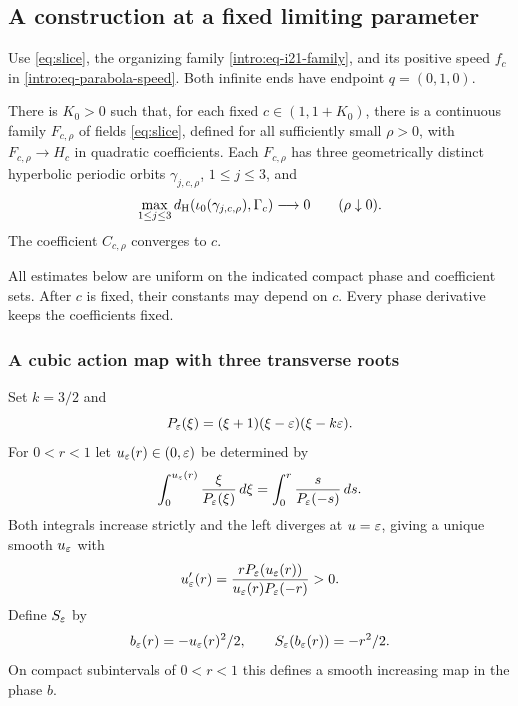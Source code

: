 \subsection{A construction at a fixed limiting parameter}

Use \eqref{eq:slice}, the organizing family \eqref{intro:eq-i21-family},
and its positive speed \(f_c\) in \eqref{intro:eq-parabola-speed}.
Both infinite ends have endpoint \(q=(0,1,0)\).

\begin{theorem}\label{p4:fixed-c}
There is $K_0>0$ such that, for each fixed $c\in(1,1+K_0)$, there is
a continuous family $F_{c,\rho}$ of fields \eqref{eq:slice},
defined for all sufficiently small $\rho>0$, with
$F_{c,\rho}\to H_c$ in quadratic coefficients.
Each $F_{c,\rho}$ has three geometrically distinct hyperbolic periodic
orbits $\gamma_{j,c,\rho}$, $1\le j\le3$, and
\[
 \max_{1\le j\le3}d_{\rm H}(\iota_0(\gamma_{j,c,\rho}),\Gamma_c)
 \longrightarrow0\qquad(\rho\downarrow0).
\]
The coefficient $C_{c,\rho}$ converges to $c$.
\end{theorem}

All estimates below are uniform on the indicated compact phase and
coefficient sets. After $c$ is fixed, their constants may depend on $c$.
Every phase derivative keeps the coefficients fixed.

\subsubsection{A cubic action map with three transverse roots}

Set $k=3/2$ and
\[
 P_\varepsilon(\xi)=(\xi+1)(\xi-\varepsilon)(\xi-k\varepsilon).
\]
For $0<r<1$ let $u_\varepsilon(r)\in(0,\varepsilon)$ be determined by
\begin{equation}\label{p4:action}
 \int_0^{u_\varepsilon(r)}\frac{\xi}{P_\varepsilon(\xi)}\,d\xi
 =\int_0^r\frac{s}{P_\varepsilon(-s)}\,d s.
\end{equation}
Both integrals increase strictly and the left diverges at $u=\varepsilon$,
giving a unique smooth $u_\varepsilon$ with
\begin{equation}\label{p4:uprime}
 u_\varepsilon'(r)=
 \frac{rP_\varepsilon(u_\varepsilon(r))}{u_\varepsilon(r)P_\varepsilon(-r)}>0.
\end{equation}
Define $S_\varepsilon$ by
\[
 b_\varepsilon(r)=-u_\varepsilon(r)^2/2,\qquad
 S_\varepsilon(b_\varepsilon(r))=-r^2/2.
\]
On compact subintervals of $0<r<1$ this defines a smooth increasing
map in the phase $b$.


